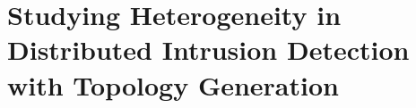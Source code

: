 \chapter{Studying Heterogeneity in Distributed Intrusion Detection with Topology Generation\label{chap:topologies}}